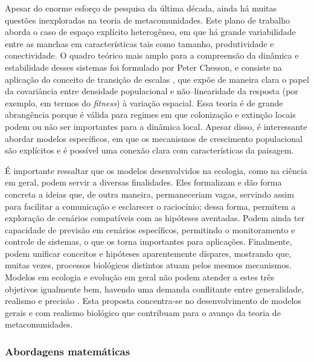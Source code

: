 \documentclass[12pt]{extarticle}
\begin{document}
Apesar do enorme esforço de pesquisa da última década, ainda há muitas
questões inexploradas na teoria de metacomunidades. Este plano de trabalho
aborda o caso de espaço explícito heterogêneo, em que há grande variabilidade entre as
manchas em características tais como tamanho, produtividade e conectividade. O
quadro teórico mais amplo para a compreensão da dinâmica e estabilidade desses
sistemas foi formulado por Peter Chesson, e consiste na aplicação do conceito
de transição de escalas \citep{chesson1981, chesson1998, chesson2005}, que
expõe de maneira clara o papel da covariância entre densidade populacional e
não--linearidade da resposta (por exemplo, em termos do \emph{fitness}) à
variação espacial. Essa teoria é de grande abrangência porque é válida para
regimes em que colonização e extinção locais podem ou não ser importantes para
a dinâmica local. Apesar disso, é interessante abordar modelos específicos,
em que os mecanismos de crescimento populacional são explícitos e é possível
uma conexão clara com características da paisagem.

É importante ressaltar que os modelos desenvolvidos na ecologia, como na
ciência em geral, podem servir a diversas finalidades. Eles formalizam e dão
forma concreta a ideias que, de outra maneira, permaneceriam vagas, servindo
assim para facilitar a comunicação e esclarecer o raciocínio; dessa forma,
permitem a exploração de cenários compatíveis com as hipóteses aventadas.
Podem ainda ter capacidade de previsão em cenários específicos, permitindo o
monitoramento e controle de sistemas, o que os torna importantes para
aplicações. Finalmente, podem unificar conceitos e hipóteses aparentemente
díspares, mostrando que, muitas vezes, processos biológicos distintos atuam
pelos mesmos mecanismos. Modelos em ecologia e evolução em geral não podem 
atender a estes três objetivos igualmente bem, havendo uma demanda conflitante
entre generalidade, realismo e precisão \citep{levins1966}. 
Esta proposta concentra-se no desenvolvimento de modelos gerais e com realismo biológico
que contribuam para o avanço da teoria de metacomunidades.


\subsubsection*{Abordagens matemáticas}
\end{document}
